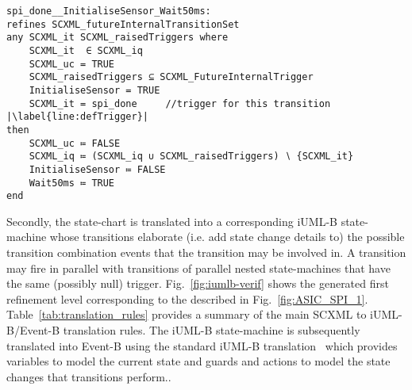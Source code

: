 \begin{lstlisting}[caption={Event-B event corresponding to internal triggered transition to \textbf{Wait50ms} state in refinement level 1 shown in Fig.~\ref{fig:ASIC}}, label={lst:SecBotMach0},language=Event-B, escapechar=|, frame=single, float=t]
spi_done__InitialiseSensor_Wait50ms:	
refines SCXML_futureInternalTransitionSet 
any SCXML_it SCXML_raisedTriggers where
	SCXML_it  ∈ SCXML_iq 
	SCXML_uc = TRUE
	SCXML_raisedTriggers ⊆ SCXML_FutureInternalTrigger
	InitialiseSensor = TRUE
	SCXML_it = spi_done  	//trigger for this transition |\label{line:defTrigger}|
then
	SCXML_uc ≔ FALSE
	SCXML_iq ≔ (SCXML_iq ∪ SCXML_raisedTriggers) ∖ {SCXML_it}
	InitialiseSensor ≔ FALSE
	Wait50ms ≔ TRUE
end
\end{lstlisting}

Secondly, the \SCXML state-chart is translated into a corresponding iUML-B state-machine whose transitions elaborate (i.e. add state change details to) the possible transition combination events that the transition may be involved in. 
A transition may fire in parallel with transitions of parallel nested state-machines that have the same (possibly null) trigger.
Fig.~\ref{fig:iumlb-verif} shows the generated \iUMLB first refinement level corresponding to the \IDS described in Fig.~\ref{fig:ASIC_SPI_1}. 
Table~\ref{tab:translation_rules} provides a summary of the main SCXML to iUML-B/Event-B translation rules.
The iUML-B state-machine is subsequently translated into Event-B using the standard iUML-B translation~\cite{snook14:_b_statem} which provides variables to model the current state and guards and actions to model the state changes that transitions perform..


